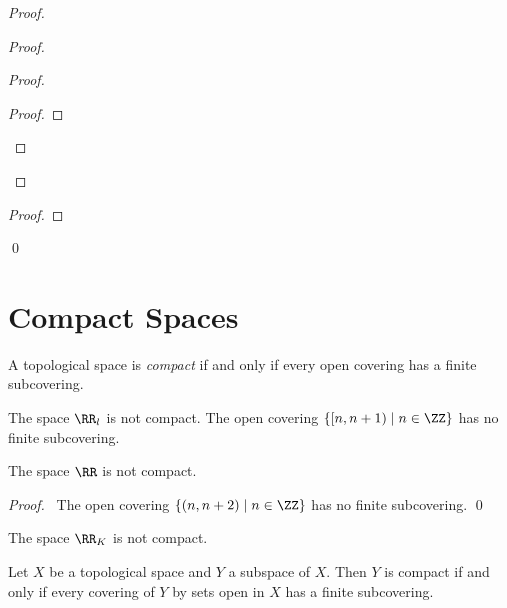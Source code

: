 \begin{proof}
\begin{proof}
\begin{proof}
\begin{proof}
            \end{proof}
        \end{proof}
    \end{proof}
    \begin{proof}
    \end{proof}
    \qed
\end{proof}

\section{Compact Spaces}

\begin{definition}[Compact]
    A topological space is \emph{compact} if and only if every open covering has a finite subcovering.
\end{definition}

\begin{example}
    The space $\RR_l$ is not compact. The open covering $\{ [n,n+1) \mid n \in \ZZ \}$ has no finite subcovering.
\end{example}

\begin{proposition}
    The space $\RR$ is not compact.
\end{proposition}

\begin{proof}
    \pf\ The open covering $\{ (n,n+2) \mid n \in \ZZ \}$ has no finite subcovering. \qed
\end{proof}

\begin{corollary}
    The space $\RR_K$ is not compact.
\end{corollary}

\begin{lemma}
    \label{lemma:finite_subcovering_subspace}
    Let $X$ be a topological space and $Y$ a subspace of $X$. Then $Y$ is compact if and only if
    every covering of $Y$ by sets open in $X$ has a finite subcovering.
\end{lemma}

